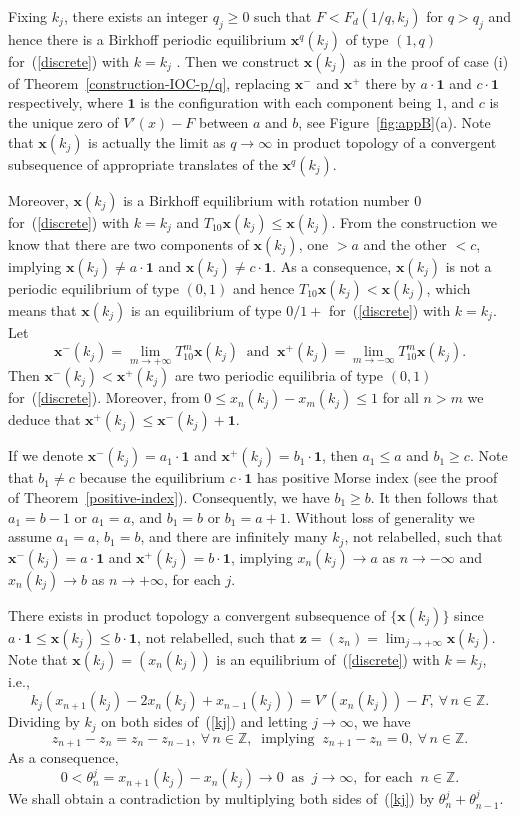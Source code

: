 \documentclass[12pt]{article}
\newcommand{\Z}{\mathbb{Z}}
\newcounter{number}
\newcommand{\begeq}{\begin{equation}}
\newcommand{\eeq}{\end{equation}}
\newcommand{\refer}[1]{~(\ref{#1})}
\newcommand{\zbf}{{\mathbf{z}}}
\newcommand{\xbf}{{\mathbf{x}}}
\newcommand{\one}{{\mathbf{1}}}
\begin{document}
Fixing $k_j$, there exists an integer $q_j\geq 0$ such that $F<F_d(1/q,k_j)$ for $q>q_j$ and hence there is a Birkhoff periodic equilibrium $\xbf^q(k_j)$ of type $(1,q)$ for\refer{discrete} with $k=k_j$ . Then we construct $\xbf(k_j)$ as in the proof of case (i) of Theorem~\ref{construction-IOC-p/q}, replacing $\xbf^-$ and $\xbf^+$ there by $a\cdot\one$ and $c\cdot\one$ respectively, where $\one$ is the configuration with each component being $1$, and $c$ is the unique zero of $V'(x)-F$ between $a$ and $b$, see Figure~\ref{fig:appB}(a). Note that $\xbf(k_j)$ is actually the limit as $q\to\infty$ in product topology of a convergent subsequence of appropriate translates of the $\xbf^q(k_j)$.

Moreover, $\xbf(k_j)$ is a Birkhoff equilibrium with rotation number $0$ for\refer{discrete} with $k=k_j$ and $T_{10}\xbf(k_j)\leq \xbf(k_j)$. From the construction we know that there are two components of $\xbf(k_j)$, one $>a$  and the other $<c$, implying $\xbf(k_j)\neq a\cdot\one$ and $\xbf(k_j)\neq c\cdot\one$. As a consequence, $\xbf(k_j)$ is not a periodic equilibrium of type $(0,1)$ and hence $T_{10}\xbf(k_j)<\xbf(k_j)$, which means that $\xbf(k_j)$ is an equilibrium of type $0/1+$ for\refer{discrete} with $k=k_j$.
Let
$$
\xbf^-(k_j)=\lim_{m\to+\infty}T_{10}^m\xbf(k_j)\ \mbox{ and }\ \xbf^+(k_j)=\lim_{m\to-\infty}T_{10}^m\xbf(k_j).
$$
Then $\xbf^-(k_j)<\xbf^+(k_j)$ are two periodic equilibria of type $(0,1)$ for\refer{discrete}. Moreover, from  $0\leq x_n(k_j)-x_m(k_j)\leq 1$ for all $n>m$ we deduce that $\xbf^+(k_j)\leq \xbf^-(k_j)+\one$. 


If we denote $\xbf^-(k_j)=a_1\cdot\one$ and $\xbf^+(k_j)=b_1\cdot\one$, then $a_1\leq a$ and $b_1\geq c$. Note that $b_1\neq c$ because the equilibrium $c\cdot\one$ has positive Morse index (see the proof of Theorem~\ref{positive-index}). Consequently, we have $b_1\geq b$. It then follows that $a_1=b-1$ or $a_1=a$, and $b_1=b$ or $b_1=a+1$. Without loss of generality we assume $a_1=a$, $b_1=b$, and there are infinitely many $k_j$, not relabelled, such that $\xbf^-(k_j)=a\cdot\one$ and $\xbf^+(k_j)=b\cdot\one$, implying $x_n(k_j)\to a$ as $n\to -\infty$ and $x_n(k_j)\to b$ as $n\to +\infty$, for each $j$.

There exists in product topology a convergent subsequence of $\{\xbf(k_j)\}$ since  $a\cdot\one\leq \xbf(k_j)\leq b\cdot\one$, not relabelled, such that 
$\zbf=(z_n)=\lim_{j\to+\infty}\xbf(k_j)$.
Note that $\xbf(k_j)=(x_n(k_j))$ is an equilibrium of\refer{discrete} with $k=k_j$, i.e.,
\begeq\label{kj}
k_j(x_{n+1}(k_j)-2x_n(k_j)+x_{n-1}(k_j))=V'(x_n(k_j))-F,\ \forall\,n\in\Z.
\eeq
Dividing by $k_j$ on both sides of\refer{kj} and letting $j\to\infty$, we have 
$$
z_{n+1}-z_n=z_n-z_{n-1}, \ \forall\,n\in\Z,  \ \mbox{ implying }\ z_{n+1}-z_n=0, \ \forall\, n\in\Z.
$$
As a consequence,
$$
0<\theta_n^j=x_{n+1}(k_j)-x_n(k_j)\to 0\ \mbox{ as }\ j\to\infty, \mbox{ for each }\ n\in\Z.
$$
We shall obtain a contradiction by multiplying  both sides of\refer{kj} by $\theta_n^j+\theta_{n-1}^j$.
\end{document}
